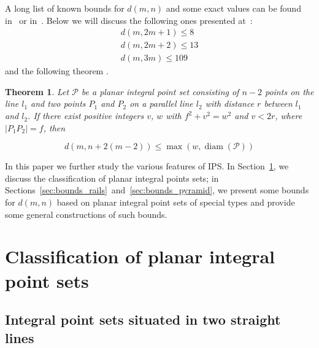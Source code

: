 \documentclass[12pt]{article}
\theoremstyle{theorem}
\newtheorem{theorem}{Theorem}
\theoremstyle{dfn}
\newtheorem{dfn}{Definition}
\theoremstyle{remark}
\begin{document}

A long list of known bounds for $d(m, n)$ and some exact values
can be found in~\cite[Theorem 1]{kurz2008bounds} or in~\cite{our-vmmsh-2018}.
Below we will discuss the following ones presented at~\cite{kurz2008bounds}:
\begin{align}
	d(m, 2m + 1) \leq 8\\
	d(m, 2m + 2) \leq 13 \label{eq:d_m_2m+2}\\
	d(m, 3m) \leq 109
\end{align}
and the following theorem \cite[Theorem 2.1]{kurz2008bounds}.

\begin{theorem}
	\label{thm:Kurz_blowup}
	Let $\mathcal{P}$ be a planar integral point set consisting of
	$n - 2$ points on the line $l_1$ and two points $P_{1}$ and $P_{2}$ on a
	parallel line $l_2$ with distance $r$ between $l_{1}$ and $l_{2}$. If there
	exist positive integers $v$, $w$ with $f^{2} + v^{2}
	= w^{2}$ and $v < 2r$, where $|P_{1}P_{2}| = f$,
	then

	\begin{equation}\label{formula1}
		d(m, n + 2(m - 2)) \leq \max(w, \operatorname{diam}(\mathcal{P}))
	\end{equation}

\end{theorem}

In this paper we further study the various features of IPS.
In Section~\ref{sec:classif}, we discuss the classification of planar integral points sets;
in Sections~\ref{sec:bounds_rails}~and~\ref{sec:bounds_pyramid}, we present some bounds for $d(m,n)$ based on planar integral point sets of special types
and provide some general constructions of such bounds.

\section{Classification of planar integral point sets}
\label{sec:classif}

\subsection{Integral point sets situated in two straight lines}
\end{document}
